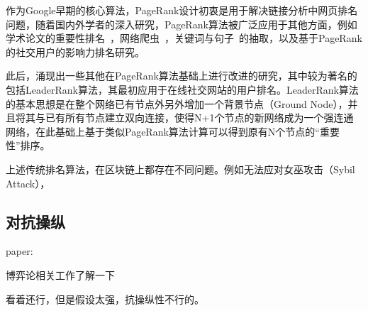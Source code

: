 作为Google早期的核心算法，PageRank设计初衷是用于解决链接分析中网页排名问题，随着国内外学者的深入研究，PageRank算法被广泛应用于其他方面，例如学术论文的重要性排名~\cite{}，网络爬虫~\cite{}，关键词与句子~\cite{}的抽取，以及基于PageRank的社交用户的影响力排名研究。

此后，涌现出一些其他在PageRank算法基础上进行改进的研究，其中较为著名的包括LeaderRank算法，其最初应用于在线社交网站的用户排名。LeaderRank算法的基本思想是在整个网络已有节点外另外增加一个背景节点（Ground Node），并且将其与已有所有节点建立双向连接，使得N+1个节点的新网络成为一个强连通网络，在此基础上基于类似PageRank算法计算可以得到原有N个节点的“重要性”排序。

上述传统排名算法，在区块链上都存在不同问题。例如无法应对女巫攻击（Sybil Attack），



\subsection{对抗操纵}
paper:

博弈论相关工作了解一下

看着还行，但是假设太强，抗操纵性不行的。
